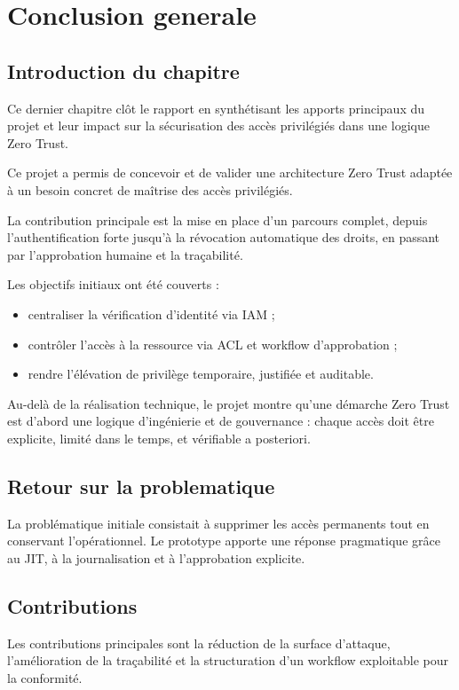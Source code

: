 \chapter{Conclusion generale}

\section{Introduction du chapitre}
Ce dernier chapitre clôt le rapport en synthétisant les apports principaux du projet et leur impact sur la sécurisation des accès privilégiés dans une logique Zero Trust.

Ce projet a permis de concevoir et de valider une architecture Zero Trust adaptée à un besoin concret de maîtrise des accès privilégiés.

La contribution principale est la mise en place d'un parcours complet, depuis l'authentification forte jusqu'à la révocation automatique des droits, en passant par l'approbation humaine et la traçabilité.

Les objectifs initiaux ont été couverts :
\begin{itemize}
	\item centraliser la vérification d'identité via IAM ;
	\item contrôler l'accès à la ressource via ACL et workflow d'approbation ;
	\item rendre l'élévation de privilège temporaire, justifiée et auditable.
\end{itemize}

Au-delà de la réalisation technique, le projet montre qu'une démarche Zero Trust est d'abord une logique d'ingénierie et de gouvernance : chaque accès doit être explicite, limité dans le temps, et vérifiable a posteriori.

\section{Retour sur la problematique}
La problématique initiale consistait à supprimer les accès permanents tout en conservant l'opérationnel. Le prototype apporte une réponse pragmatique grâce au JIT, à la journalisation et à l'approbation explicite.

\section{Contributions}
Les contributions principales sont la réduction de la surface d'attaque, l'amélioration de la traçabilité et la structuration d'un workflow exploitable pour la conformité.

